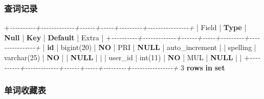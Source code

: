 \documentclass[
]{article}
\newenvironment{Shaded}{}{}
\newcommand{\CommentTok}[1]{\textcolor[rgb]{0.38,0.63,0.69}{\textit{#1}}}
\newcommand{\DataTypeTok}[1]{\textcolor[rgb]{0.56,0.13,0.00}{#1}}
\newcommand{\DecValTok}[1]{\textcolor[rgb]{0.25,0.63,0.44}{#1}}
\newcommand{\KeywordTok}[1]{\textcolor[rgb]{0.00,0.44,0.13}{\textbf{#1}}}
\newcommand{\NormalTok}[1]{#1}
\newcommand{\OperatorTok}[1]{\textcolor[rgb]{0.40,0.40,0.40}{#1}}
\begin{document}
\hypertarget{ux67e5ux8bcdux8bb0ux5f55}{%
\subsubsection{查词记录}\label{ux67e5ux8bcdux8bb0ux5f55}}

\begin{Shaded}
\begin{Highlighting}[]
\OperatorTok{+}\CommentTok{{-}{-}{-}{-}{-}{-}{-}{-}{-}{-}+{-}{-}{-}{-}{-}{-}{-}{-}{-}{-}{-}{-}{-}+{-}{-}{-}{-}{-}{-}+{-}{-}{-}{-}{-}+{-}{-}{-}{-}{-}{-}{-}{-}{-}+{-}{-}{-}{-}{-}{-}{-}{-}{-}{-}{-}{-}{-}{-}{-}{-}+}
\NormalTok{| Field    | }\KeywordTok{Type}\NormalTok{        | }\KeywordTok{Null}\NormalTok{ | }\KeywordTok{Key}\NormalTok{ | }\KeywordTok{Default}\NormalTok{ | Extra          |}
\OperatorTok{+}\CommentTok{{-}{-}{-}{-}{-}{-}{-}{-}{-}{-}+{-}{-}{-}{-}{-}{-}{-}{-}{-}{-}{-}{-}{-}+{-}{-}{-}{-}{-}{-}+{-}{-}{-}{-}{-}+{-}{-}{-}{-}{-}{-}{-}{-}{-}+{-}{-}{-}{-}{-}{-}{-}{-}{-}{-}{-}{-}{-}{-}{-}{-}+}
\NormalTok{| }\KeywordTok{id}\NormalTok{       | bigint(}\DecValTok{20}\NormalTok{)  | }\KeywordTok{NO}\NormalTok{   | PRI | }\KeywordTok{NULL}\NormalTok{    | auto\_increment |}
\NormalTok{| spelling | }\DataTypeTok{varchar}\NormalTok{(}\DecValTok{25}\NormalTok{) | }\KeywordTok{NO}\NormalTok{   |     | }\KeywordTok{NULL}\NormalTok{    |                |}
\NormalTok{| user\_id  | }\DataTypeTok{int}\NormalTok{(}\DecValTok{11}\NormalTok{)     | }\KeywordTok{NO}\NormalTok{   | MUL | }\KeywordTok{NULL}\NormalTok{    |                |}
\OperatorTok{+}\CommentTok{{-}{-}{-}{-}{-}{-}{-}{-}{-}{-}+{-}{-}{-}{-}{-}{-}{-}{-}{-}{-}{-}{-}{-}+{-}{-}{-}{-}{-}{-}+{-}{-}{-}{-}{-}+{-}{-}{-}{-}{-}{-}{-}{-}{-}+{-}{-}{-}{-}{-}{-}{-}{-}{-}{-}{-}{-}{-}{-}{-}{-}+}
\DecValTok{3} \KeywordTok{rows} \KeywordTok{in} \KeywordTok{set}
\end{Highlighting}
\end{Shaded}

\hypertarget{ux5355ux8bcdux6536ux85cfux8868}{%
\subsubsection{单词收藏表}\label{ux5355ux8bcdux6536ux85cfux8868}}
\end{document}
